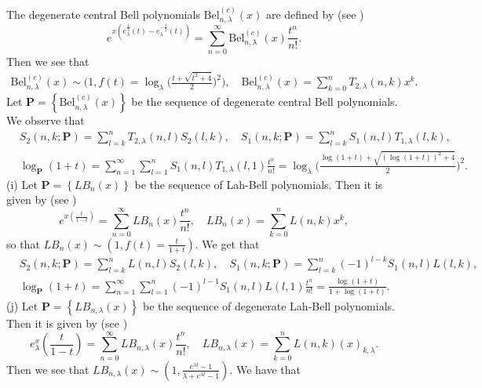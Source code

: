 \documentclass[a4paper,11pt]{amsart}
\begin{document}
The degenerate central Bell polynomials $\mathrm{Bel}_{n,\lambda}^{(c)}(x)$ are defined by (see \cite{17})
\begin{equation*}
e^{x(e_{\lambda}^{\frac{1}{2}}(t)-e_{\lambda}^{-\frac{1}{2}}(t))}=\sum_{n=0}^{\infty}\mathrm{Bel}_{n,\lambda}^{(c)}(x)\frac{t^{n}}{n!}.
\end{equation*}
Then we see that
\begin{align*}
\mathrm{Bel}_{n,\lambda}^{(c)}(x) \sim \bigg(1, f(t)=\log_{\lambda}\bigg(\frac{t+\sqrt{t^{2}+4}}{2}\bigg)^{2}\bigg),\quad
\mathrm{Bel}_{n,\lambda}^{(c)}(x)=\sum_{k=0}^{n}T_{2,\lambda}(n,k) x^{k}.
\end{align*}
Let $\mathbf{P}=\left\{\mathrm{Bel}_{n,\lambda}^{(c)}(x)\right\}$ be the sequence of degenerate central Bell polynomials. We observe that
\begin{align*}
&S_{2}(n,k;\mathbf{P})=\sum_{l=k}^{n}T_{2,\lambda}(n,l)S_{2}(l,k), \quad S_{1}(n,k;\mathbf{P})=\sum_{l=k}^{n}S_{1}(n,l)T_{1,\lambda}(l,k), \\
& \log_{\mathbf{P}}(1+t)=\sum_{n=1}^{\infty}\sum_{l=1}^{n}S_{1}(n,l)T_{1,\lambda}(l,1)\frac{t^{n}}{n!}=\log_{\lambda}\bigg(\frac{\log(1+t)+\sqrt{(\log(1+t))^{2}+4}}{2}\bigg)^{2}.
\end{align*}
(i) Let $\mathbf{P}=\left\{LB_{n}(x)\right\}$ be the sequence of Lah-Bell polynomials. Then it is given by (see \cite{11})
\begin{equation*}
e^{x(\frac{t}{1-t})}=\sum_{n=0}^{\infty}LB_{n}(x)\frac{t^n}{n!}, \quad LB_{n}(x)=\sum_{k=0}^{n}L(n,k)x^{k},
\end{equation*}
so that $LB_{n}(x) \sim (1, f(t)=\frac{t}{1+t})$. We get that
\begin{align*}
&S_{2}(n,k;\mathbf{P})=\sum_{l=k}^{n}L(n,l)S_{2}(l,k), \quad S_{1}(n,k;\mathbf{P})=\sum_{l=k}^{n}(-1)^{l-k}S_{1}(n,l)L(l,k), \\
&\log_{\mathbf{P}}(1+t)=\sum_{n=1}^{\infty}\sum_{l=1}^{n}(-1)^{l-1}S_{1}(n,l)L(l,1)\frac{t^{n}}{n!}=\frac{\log(1+t)}{1+\log(1+t)}.
\end{align*}
(j) Let $\mathbf{P}=\left\{LB_{n,\lambda}(x)\right\}$ be the sequence of degenerate Lah-Bell polynomials. Then it is given by (see \cite{13})
\begin{equation*}
e_{\lambda}^{x}(\frac{t}{1-t})=\sum_{n=0}^{\infty}LB_{n,\lambda}(x)\frac{t^n}{n!}, \quad LB_{n,\lambda}(x)=\sum_{k=0}^{n}L(n,k)(x)_{k,\lambda}.
\end{equation*}
Then we see that $LB_{n,\lambda}(x) \sim (1,\frac{e^{\lambda t}-1}{\lambda+e^{\lambda t}-1})$. We have that
\end{document}
